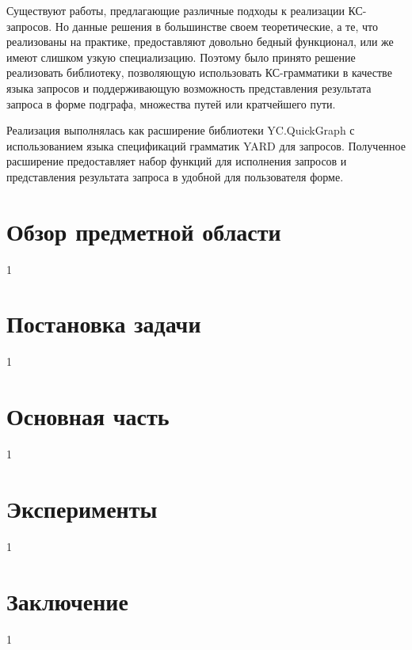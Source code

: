 \documentclass[14pt]{matmex-diploma-custom}
\begin{document}
	Существуют работы, предлагающие различные подходы к реализации КС-запросов. Но данные решения в большинстве своем теоретические, а те, что реализованы на практике, предоставляют довольно бедный функционал, или же имеют слишком узкую специализацию. Поэтому было принято решение реализовать библиотеку, позволяющую использовать КС-грамматики в качестве языка запросов и поддерживающую возможность представления результата запроса в форме подграфа, множества путей или кратчейшего пути.
	
	Реализация выполнялась как расширение библиотеки YC.QuickGraph \cite{YC.QuickGraph} с использованием языка спецификаций грамматик YARD \cite{YARD} для запросов. Полученное расширение предоставляет набор функций для исполнения запросов и представления результата запроса в удобной для пользователя форме. 
	
\section{Обзор предметной области}
1
\section{Постановка задачи}
1
\section{Основная часть}
1
\section{Эксперименты}
1
\section*{Заключение}
1
\setmonofont[Mapping=tex-text]{CMU Typewriter Text}


\end{document}
